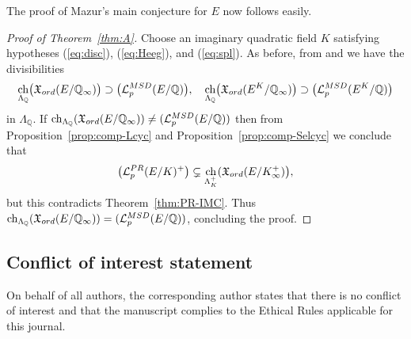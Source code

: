 \documentclass[a4paper,10pt]{amsart}
\numberwithin{equation}{section}
\numberwithin{equation}{section}
\theoremstyle{plain}
\theoremstyle{definition}
\theoremstyle{definition}
\theoremstyle{plain}
\theoremstyle{plain}
\theoremstyle{plain}
\theoremstyle{plain}
\newcommand{\Q}{\mathbb{Q}}
\newcommand{\X}{\mathfrak{X}}
\DeclareMathOperator{\ch}{ch}
\newcommand{\Lcal}{\mathcal{L}}
\begin{document}
The proof of Mazur's main conjecture for $E$ now follows easily.

\begin{proof}[Proof of Theorem~\ref{thm:A}] 
Choose an imaginary quadratic field $K$ satisfying hypotheses (\ref{eq:disc}), (\ref{eq:Heeg}), and (\ref{eq:spl}). As before, from \cite{kato-euler-systems} and \cite{wuthrich-int} we have the divisibilities
\[
\ch_{\Lambda_\Q}\bigl(\X_{\rm ord}(E/\Q_\infty)\bigr)\supset\bigl(\Lcal_p^{\rm MSD}(E/\Q)\bigr),\quad\ch_{\Lambda_\Q}\bigl(\X_{\rm ord}(E^K/\Q_\infty)\bigr)\supset\bigl(\Lcal_p^{\rm MSD}(E^K/\Q)\bigr)
\]
in $\Lambda_\Q$. If $\ch_{\Lambda_\Q}(\X_{\rm ord}(E/\Q_\infty))\neq(\Lcal_p^{\rm MSD}(E/\Q))$ then from Proposition~\ref{prop:comp-Lcyc} and Proposition~\ref{prop:comp-Selcyc} we conclude that 
\[
\bigl(\Lcal_p^{\rm PR}(E/K)^+\bigr)\subsetneq
\ch_{\Lambda_K^+}(\X_{\rm ord}(E/K_\infty^+)\bigr),
\]
but this contradicts Theorem~\ref{thm:PR-IMC}. Thus $\ch_{\Lambda_\Q}(\X_{\rm ord}(E/\Q_\infty))=(\Lcal_p^{\rm MSD}(E/\Q))$, concluding the proof.
\end{proof}


\subsection*{Conflict of interest statement} On behalf of all authors, the corresponding author states that there is no conflict of interest and that the manuscript complies to the Ethical Rules applicable for this journal.



\end{document}
